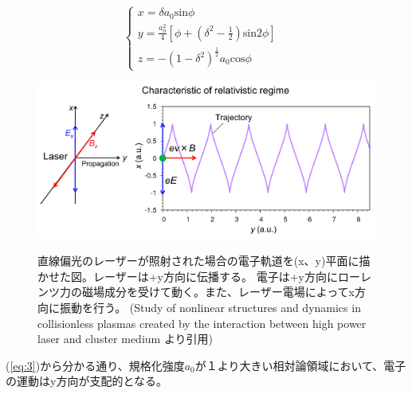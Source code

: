 \documentclass[a4paper,11pt,titlepage]{jarticle}
\numberwithin{equation}{section} %
\begin{document}
  \begin{equation}
    \label{eq:3}
      \left\{
        \begin{array}{ll}
          x = \delta a_0 \textrm{sin}\phi & \\
          y = \frac{a_0^2}{4}[\phi + (\delta^2 - \frac{1}{2})\textrm{sin2}\phi ] & \\
          z = -(1-\delta^2)^{\frac{1}{2}} a_0 \textrm{cos}\phi 
        \end{array}
      \right.
    \end{equation}
  \begin{figure}[H]
    \begin{center}
      \includegraphics[keepaspectratio,width=\linewidth]{./image/2-1/2-1_propagation.png}
      \label{}
      \caption{
        直線偏光のレーザーが照射された場合の電子軌道を(x、y)平面に描かせた図。レーザーは+y方向に伝播する。
        電子は+y方向にローレンツ力の磁場成分を受けて動く。また、レーザー電場によってx方向に振動を行う。
        (Study of nonlinear structures and dynamics in collisionless plasmas created by the 
        interaction between high power laser and cluster medium より引用)
      }
    \end{center}
  \end{figure}   
  (\ref{eq:3})から分かる通り、規格化強度$a_0$が１より大きい相対論領域において、電子の運動はy方向が支配的となる。
\end{document}
